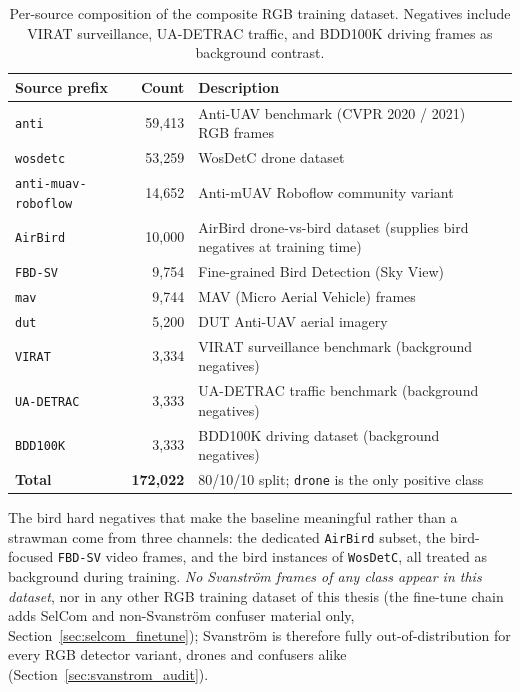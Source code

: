\begin{table}[htbp]
    \centering
    \caption{Per-source composition of the composite RGB training dataset. Negatives include VIRAT surveillance, UA-DETRAC traffic, and BDD100K driving frames as background contrast.}
    \label{tab:ds_rgb_components}
    \begin{tabular}{lrp{7.2cm}}
        \toprule
        Source prefix & Count & Description \\
        \midrule
        \texttt{anti}                 & 59{,}413 & Anti-UAV benchmark (CVPR 2020 / 2021)~\cite{jiang2021antiuav} RGB frames \\
        \texttt{wosdetc}              & 53{,}259 & WosDetC drone dataset \\
        \texttt{anti-muav-roboflow}   & 14{,}652 & Anti-mUAV Roboflow community variant \\
        \texttt{AirBird}              & 10{,}000 & AirBird drone-vs-bird dataset (supplies bird negatives at training time) \\
        \texttt{FBD-SV}               &  9{,}754 & Fine-grained Bird Detection (Sky View) \\
        \texttt{mav}                  &  9{,}744 & MAV (Micro Aerial Vehicle) frames \\
        \texttt{dut}                  &  5{,}200 & DUT Anti-UAV aerial imagery~\cite{zhao2022dutantiuav} \\
        \texttt{VIRAT}                &  3{,}334 & VIRAT surveillance benchmark (background negatives) \\
        \texttt{UA-DETRAC}            &  3{,}333 & UA-DETRAC traffic benchmark (background negatives) \\
        \texttt{BDD100K}              &  3{,}333 & BDD100K driving dataset (background negatives) \\
        \midrule
        \textbf{Total}                & \textbf{172{,}022} & 80/10/10 split; \texttt{drone} is the only positive class \\
        \bottomrule
    \end{tabular}
\end{table}

The bird hard negatives that make the baseline meaningful rather than a strawman come from three channels: the dedicated \texttt{AirBird} subset, the bird-focused \texttt{FBD-SV} video frames, and the bird instances of \texttt{WosDetC}, all treated as background during training. \emph{No Svanstr\"om frames of any class appear in this dataset}, nor in any other RGB training dataset of this thesis (the fine-tune chain adds SelCom and non-Svanstr\"om confuser material only, Section~\ref{sec:selcom_finetune}); Svanstr\"om is therefore fully out-of-distribution for every RGB detector variant, drones and confusers alike (Section~\ref{sec:svanstrom_audit}).

